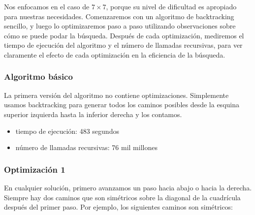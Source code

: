 Nos enfocamos en el caso de $7 \times 7$,
porque su nivel de dificultad es apropiado para nuestras necesidades.
Comenzaremos con un algoritmo de backtracking sencillo,
y luego lo optimizaremos paso a paso utilizando observaciones
sobre cómo se puede podar la búsqueda.
Después de cada optimización, mediremos el tiempo de ejecución
del algoritmo y el número de llamadas recursivas,
para ver claramente el efecto de cada
optimización en la eficiencia de la búsqueda.

\subsubsection{Algoritmo básico}

La primera versión del algoritmo no contiene optimizaciones.
Simplemente usamos backtracking para generar
todos los caminos posibles desde la esquina superior izquierda hasta
la inferior derecha y los contamos.

\begin{itemize}[itemsep=0em,topsep=0.5em]
    \item tiempo de ejecución: 483 segundos
    \item número de llamadas recursivas: 76 mil millones
\end{itemize}

\subsubsection{Optimización 1}

En cualquier solución, primero avanzamos un paso
hacia abajo o hacia la derecha.
Siempre hay dos caminos que son simétricos
sobre la diagonal de la cuadrícula
después del primer paso.
Por ejemplo, los siguientes caminos son simétricos:

